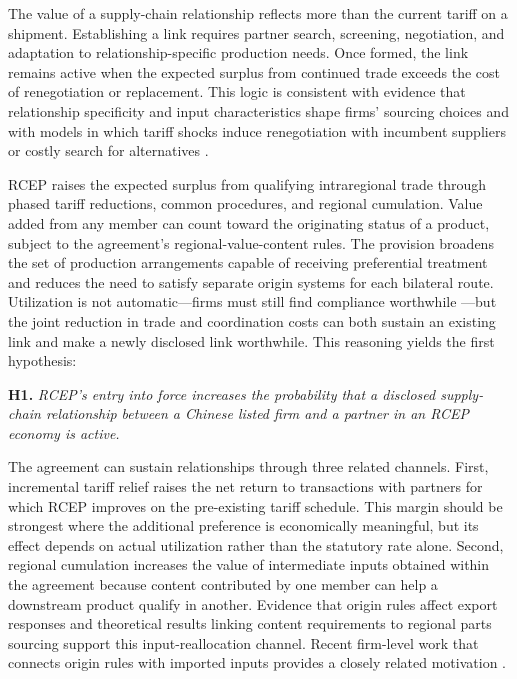 \documentclass[preprint,12pt,authoryear]{elsarticle}
\begin{document}
The value of a supply-chain relationship reflects more than the current tariff on a shipment. Establishing a link requires partner search, screening, negotiation, and adaptation to relationship-specific production needs. Once formed, the link remains active when the expected surplus from continued trade exceeds the cost of renegotiation or replacement. This logic is consistent with evidence that relationship specificity and input characteristics shape firms' sourcing choices \citep{garg2023within} and with models in which tariff shocks induce renegotiation with incumbent suppliers or costly search for alternatives \citep{grossman2024tariffs}.

RCEP raises the expected surplus from qualifying intraregional trade through phased tariff reductions, common procedures, and regional cumulation. Value added from any member can count toward the originating status of a product, subject to the agreement's regional-value-content rules. The provision broadens the set of production arrangements capable of receiving preferential treatment and reduces the need to satisfy separate origin systems for each bilateral route. Utilization is not automatic---firms must still find compliance worthwhile \citep{hayakawa2023firm}---but the joint reduction in trade and coordination costs can both sustain an existing link and make a newly disclosed link worthwhile. This reasoning yields the first hypothesis:

\noindent\textbf{H1.} \textit{RCEP's entry into force increases the probability that a disclosed supply-chain relationship between a Chinese listed firm and a partner in an RCEP economy is active.}

The agreement can sustain relationships through three related channels. First, incremental tariff relief raises the net return to transactions with partners for which RCEP improves on the pre-existing tariff schedule. This margin should be strongest where the additional preference is economically meaningful, but its effect depends on actual utilization rather than the statutory rate alone. Second, regional cumulation increases the value of intermediate inputs obtained within the agreement because content contributed by one member can help a downstream product qualify in another. Evidence that origin rules affect export responses \citep{tanaka2022rooexports,hayakawa2023reform} and theoretical results linking content requirements to regional parts sourcing \citep{head2024laffer} support this input-reallocation channel. Recent firm-level work that connects origin rules with imported inputs provides a closely related motivation \citep{zhou2025origin}.
\end{document}
